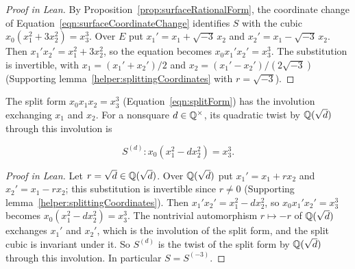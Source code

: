 \begin{proof}[Proof in Lean]

\leanok


By Proposition~\ref{prop:surfaceRationalForm}, the coordinate change of Equation~\ref{eqn:surfaceCoordinateChange} identifies $S$ with the cubic $x_0(x_1^2+3x_2^2)=x_3^3$. Over $E$ put $x_1'=x_1+\sqrt{-3}\,x_2$ and $x_2'=x_1-\sqrt{-3}\,x_2$. Then $x_1'x_2'=x_1^2+3x_2^2$, so the equation becomes $x_0x_1'x_2'=x_3^3$. The substitution is invertible, with $x_1=(x_1'+x_2')/2$ and $x_2=(x_1'-x_2')/(2\sqrt{-3})$ (Supporting lemma~\ref{helper:splittingCoordinates} with $r=\sqrt{-3}$).

\end{proof}

\begin{equationnode}

\label{eqn:surfaceQuadraticTwist}


\leanok

The split form $x_0x_1x_2=x_3^3$ (Equation~\ref{eqn:splitForm}) has the involution exchanging $x_1$ and $x_2$. For a nonsquare $d\in\mathbb{Q}^\times$, its quadratic twist by $\mathbb{Q}(\sqrt d)$ through this involution is

\begin{equation*} S^{(d)}\colon x_0(x_1^2-dx_2^2)=x_3^3. \end{equation*}

\end{equationnode}

\begin{proof}[Proof in Lean]

\leanok


Let $r=\sqrt d\in\mathbb{Q}(\sqrt d)$. Over $\mathbb{Q}(\sqrt d)$ put $x_1'=x_1+rx_2$ and $x_2'=x_1-rx_2$; this substitution is invertible since $r\neq0$ (Supporting lemma~\ref{helper:splittingCoordinates}). Then $x_1'x_2'=x_1^2-dx_2^2$, so $x_0x_1'x_2'=x_3^3$ becomes $x_0(x_1^2-dx_2^2)=x_3^3$. The nontrivial automorphism $r\mapsto-r$ of $\mathbb{Q}(\sqrt d)$ exchanges $x_1'$ and $x_2'$, which is the involution of the split form, and the split cubic is invariant under it. So $S^{(d)}$ is the twist of the split form by $\mathbb{Q}(\sqrt d)$ through this involution. In particular $S=S^{(-3)}$.

\end{proof}

